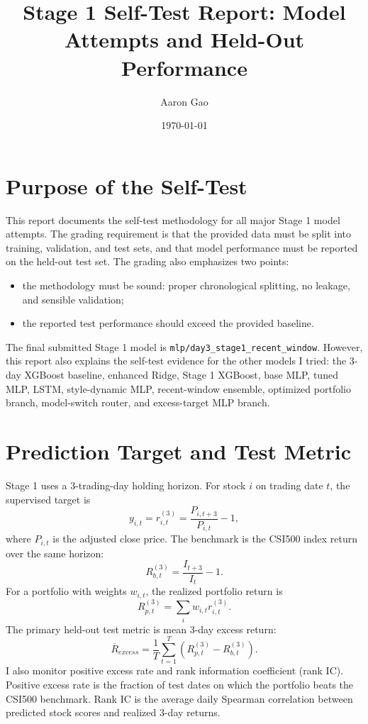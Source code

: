 \documentclass[11pt]{article}
\title{Stage 1 Self-Test Report: Model Attempts and Held-Out Performance}
\author{Aaron Gao}
\date{\today}
\begin{document}
\maketitle

\section{Purpose of the Self-Test}

This report documents the self-test methodology for all major Stage 1 model
attempts. The grading requirement is that the provided data must be split into
training, validation, and test sets, and that model performance must be reported
on the held-out test set. The grading also emphasizes two points:
\begin{itemize}
    \item the methodology must be sound: proper chronological splitting, no
    leakage, and sensible validation;
    \item the reported test performance should exceed the provided baseline.
\end{itemize}

The final submitted Stage 1 model is
\texttt{mlp/day3\_stage1\_recent\_window}. However, this report also explains
the self-test evidence for the other models I tried: the 3-day XGBoost
baseline, enhanced Ridge, Stage 1 XGBoost, base MLP, tuned MLP, LSTM,
style-dynamic MLP, recent-window ensemble, optimized portfolio branch,
model-switch router, and excess-target MLP branch.

\section{Prediction Target and Test Metric}

Stage 1 uses a 3-trading-day holding horizon. For stock \(i\) on trading date
\(t\), the supervised target is
\[
    y_{i,t}
    =
    r_{i,t}^{(3)}
    =
    \frac{P_{i,t+3}}{P_{i,t}} - 1,
\]
where \(P_{i,t}\) is the adjusted close price. The benchmark is the CSI500
index return over the same horizon:
\[
    R_{b,t}^{(3)}
    =
    \frac{I_{t+3}}{I_t} - 1.
\]
For a portfolio with weights \(w_{i,t}\), the realized portfolio return is
\[
    R_{p,t}^{(3)}
    =
    \sum_i w_{i,t} r_{i,t}^{(3)}.
\]
The primary held-out test metric is mean 3-day excess return:
\[
    \overline{R}_{excess}
    =
    \frac{1}{T}\sum_{t=1}^{T}
    \left(R_{p,t}^{(3)} - R_{b,t}^{(3)}\right).
\]
I also monitor positive excess rate and rank information coefficient (rank IC).
Positive excess rate is the fraction of test dates on which the portfolio beats
the CSI500 benchmark. Rank IC is the average daily Spearman correlation between
predicted stock scores and realized 3-day returns.
\end{document}
